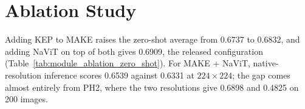 \documentclass{article}
\begin{document}
\begin{table}[H]
\centering
{}
\caption{Concept intervention. AUROC before and after suppressing the artifact-related concepts in three biased ISIC subsets.}
\label{tab:concept_intervention}
\end{table}


\section{Ablation Study}
\label{sec:ablation}

Adding KEP to MAKE raises the zero-shot average from 0.6737 to 0.6832, and adding NaViT on top of both gives 0.6909, the released configuration (Table~\ref{tab:module_ablation_zero_shot}). For MAKE + NaViT, native-resolution inference scores 0.6539 against 0.6331 at $224\times224$; the gap comes almost entirely from PH2, where the two resolutions give 0.6898 and 0.4825 on 200 images.
\end{document}
